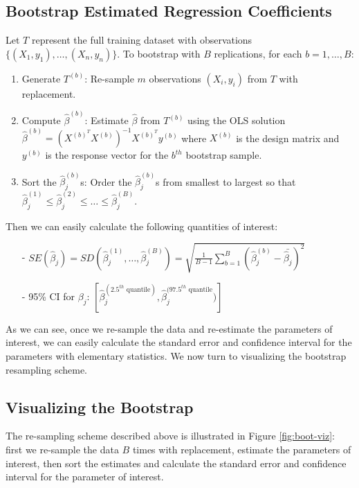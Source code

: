 \documentclass[twoside]{article}
\theoremstyle{definition}
\begin{document}
\subsection{Bootstrap Estimated Regression Coefficients}

Let $T$ represent the full training dataset with observations $\{(X_1, y_1), \ldots, (X_n, y_n)\}$. To bootstrap with $B$ replications, for each $b = 1, \ldots, B$:
\begin{enumerate}
    \item Generate $T^{(b)}$: Re-sample $m$ observations $(X_i, y_i)$ from $T$ with replacement.
    \item Compute $\widehat{\beta}^{(b)}$: Estimate $\widehat{\beta}$ from $T^{(b)}$ using the OLS solution $\widehat{\beta}^{(b)} = (X^{(b)^T}X^{(b)})^{-1}X^{(b)^T}y^{(b)}$ where $X^{(b)}$ is the design matrix and $y^{(b)}$ is the response vector for the $b^{th}$ bootstrap sample.
    \item Sort the $\widehat{\beta}_j^{(b)}$s: Order the $\widehat{\beta}_j^{(b)}$s from smallest to largest so that $\widehat{\beta}_j^{(1)} \leq \widehat{\beta}_j^{(2)} \leq \ldots \leq \widehat{\beta}_j^{(B)}$.
\end{enumerate}
Then we can easily calculate the following quantities of interest:
\begin{itemize}
    \item[-] $SE(\widehat{\beta}_j) = SD(\widehat{\beta}_j^{(1)}, \ldots, \widehat{\beta}_j^{(B)}) = \sqrt{\frac{1}{B - 1} \sum_{b=1}^B \left(\widehat{\beta}_j^{(b)} - \bar{\widehat{\beta}_j}\right)^2}$
    \item[-] 95\% CI for $\beta_j$: $[\widehat{\beta}_j^{(2.5^{th} \text{ quantile})}, \widehat{\beta}_j^{(97.5^{th} \text{ quantile}})]$
\end{itemize}

As we can see, once we re-sample the data and re-estimate the parameters of interest, we can easily calculate the standard error and confidence interval for the parameters with elementary statistics. We now turn to visualizing the bootstrap resampling scheme.

\subsection{Visualizing the Bootstrap}

The re-sampling scheme described above is illustrated in Figure \ref{fig:boot-viz}: first we re-sample the data $B$ times with replacement, estimate the parameters of interest, then sort the estimates and calculate the standard error and confidence interval for the parameter of interest.
\end{document}
